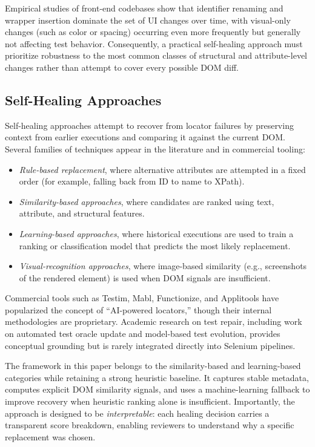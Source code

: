 \documentclass[conference]{IEEEtran}
\begin{document}
Empirical studies of front-end codebases show that identifier renaming and wrapper insertion dominate the set of UI changes over time, with visual-only changes (such as color or spacing) occurring even more frequently but generally not affecting test behavior. Consequently, a practical self-healing approach must prioritize robustness to the most common classes of structural and attribute-level changes rather than attempt to cover every possible DOM diff.

\subsection{Self-Healing Approaches}
Self-healing approaches attempt to recover from locator failures by preserving context from earlier executions and comparing it against the current DOM. Several families of techniques appear in the literature and in commercial tooling:
\begin{itemize}[leftmargin=1.2em]
    \item \emph{Rule-based replacement}, where alternative attributes are attempted in a fixed order (for example, falling back from ID to name to XPath).
    \item \emph{Similarity-based approaches}, where candidates are ranked using text, attribute, and structural features.
    \item \emph{Learning-based approaches}, where historical executions are used to train a ranking or classification model that predicts the most likely replacement.
    \item \emph{Visual-recognition approaches}, where image-based similarity (e.g., screenshots of the rendered element) is used when DOM signals are insufficient.
\end{itemize}
Commercial tools such as Testim, Mabl, Functionize, and Applitools have popularized the concept of ``AI-powered locators,'' though their internal methodologies are proprietary. Academic research on test repair, including work on automated test oracle update and model-based test evolution, provides conceptual grounding but is rarely integrated directly into Selenium pipelines.

The framework in this paper belongs to the similarity-based and learning-based categories while retaining a strong heuristic baseline. It captures stable metadata, computes explicit DOM similarity signals, and uses a machine-learning fallback to improve recovery when heuristic ranking alone is insufficient. Importantly, the approach is designed to be \emph{interpretable}: each healing decision carries a transparent score breakdown, enabling reviewers to understand why a specific replacement was chosen.
\end{document}
